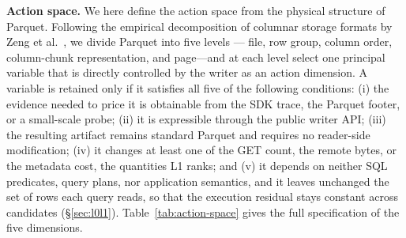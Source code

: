 \textbf{Action space.}
We here define the action space from the physical structure
of Parquet. Following the empirical decomposition of columnar storage formats by Zeng et al.~\cite{zeng2023empirical}, we divide Parquet into five levels --- file, row group, column order, column-chunk representation, and page---and at each level select one principal variable that is directly controlled by the writer as an action dimension. 
A variable is retained only if it satisfies all five of the following
conditions: (i) the evidence needed to price it is obtainable from the SDK
trace, the Parquet footer, or a small-scale probe; (ii) it is expressible
through the public writer API; (iii) the resulting artifact remains standard Parquet and requires no reader-side modification; (iv) it changes at least one of the GET count, the remote bytes, or the metadata cost, the quantities L1 ranks; and (v) it depends on neither SQL predicates, query plans, nor application semantics, and it leaves unchanged the set of rows each query reads, so that the execution residual stays constant across candidates (\S\ref{sec:l0l1}).
Table~\ref{tab:action-space} gives the full specification of the five
dimensions.


